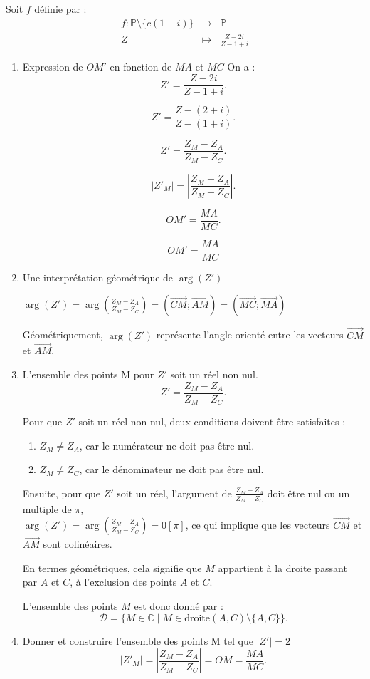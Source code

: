 \documentclass[12pt,a4paper]{article}
\begin{document}
Soit $f$ définie par :
$$
\begin{array}{rcl}
f : \mathbb{P} \setminus \{c(1 - i)\}&\to& \mathbb{P}\\
Z &\mapsto &\frac{Z - 2i}{Z - 1 + i}
\end{array}
$$
\begin{enumerate}
\item Expression de $OM'$ en fonction de $MA$ et $MC$
On a :
\[
Z' = \frac{Z - 2i}{Z - 1 + i}.
\]

\[
Z' = \frac{Z - (2 + i)}{Z - (1 + i)}.
\]

\[
Z' = \frac{Z_M - Z_A}{Z_M - Z_C}.
\]

\[
|Z'_M| = \left|\frac{Z_M - Z_A}{Z_M - Z_C}\right|.
\]

\[
OM' = \frac{MA}{MC}.
\]

\[
\boxed{OM' = \frac{MA}{MC}}
\]
\item Une interprétation géométrique de $\arg(Z')$

$\arg(Z')=\arg\left( \frac{Z_M - Z_A}{Z_M - Z_C} \right) = \left( \overrightarrow{CM};\overrightarrow{AM} \right) = \left( \overrightarrow{MC};\overrightarrow{MA} \right) $

Géométriquement, $\arg(Z')$ représente l'angle orienté entre les vecteurs $\overrightarrow{CM}$ et $\overrightarrow{AM}$.
\item L'ensemble des points M pour $Z'$ soit un réel non nul.
 \[
    Z' = \frac{Z_M - Z_A}{Z_M - Z_C}.
    \]

    Pour que $Z'$ soit un réel non nul, deux conditions doivent être satisfaites :
    \begin{enumerate}
        \item \( Z_M \neq Z_A \), car le numérateur ne doit pas être nul.
        \item \( Z_M \neq Z_C \), car le dénominateur ne doit pas être nul.
    \end{enumerate}

    Ensuite, pour que \( Z' \) soit un réel, l'argument de \(\frac{Z_M - Z_A}{Z_M - Z_C}\) doit être nul ou un multiple de \(\pi\),\\$\arg(Z')=\arg\left( \frac{Z_M - Z_A}{Z_M - Z_C} \right)=0[\pi]$, ce qui implique que les vecteurs \(\overrightarrow{CM}\) et \(\overrightarrow{AM}\) sont colinéaires.

    En termes géométriques, cela signifie que \( M \) appartient à la droite passant par \( A \) et \( C \), à l'exclusion des points \( A \) et \( C \).

    L'ensemble des points \( M \) est donc donné par :
    \[
    \mathcal{D} = \{M \in \mathbb{C} \mid M \in \text{droite}(A, C) \setminus \{A, C\}\}.
    \]
\item Donner et construire l'ensemble des points M tel que \( |Z'|=2 \)
\[
|Z'_M| = \left|\frac{Z_M - Z_A}{Z_M - Z_C}\right|=OM = \frac{MA}{MC}.
\]


\end{enumerate}
\end{document}
